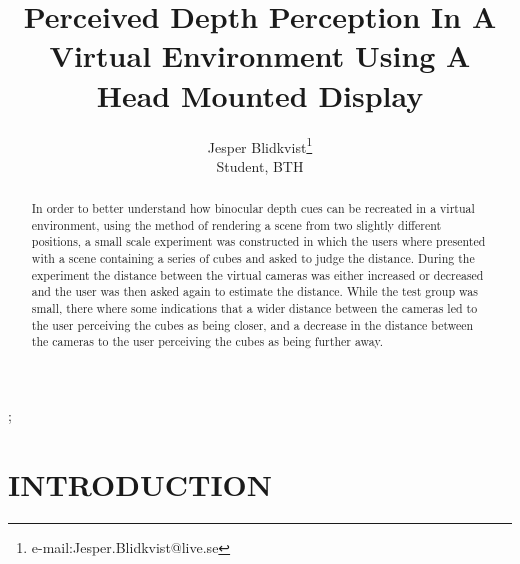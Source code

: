 \documentclass[tog]{acmsiggraph}
\title{Perceived Depth Perception In A Virtual Environment Using A Head Mounted Display}
\author{Jesper Blidkvist\thanks{e-mail:Jesper.Blidkvist@live.se}\\Student, BTH}
\begin{document}


\maketitle

\begin{abstract}

In order to better understand how binocular depth cues can be recreated in a virtual environment, using the method of rendering a scene from two slightly different positions, a small scale experiment was constructed in which the users where presented with a scene containing a series of cubes and asked to judge the distance. During the experiment the distance between the virtual cameras was either increased or decreased and the user was then asked again to estimate the distance. While the test group was small, there where some indications that a wider distance between the cameras led to the user perceiving the cubes as being closer, and a decrease in the distance between the cameras to the user perceiving the cubes as being further away.



\end{abstract}

\begin{CRcatlist}
  ;
\end{CRcatlist}

\keywordlist


\copyrightspace

\section{INTRODUCTION}
\end{document}
